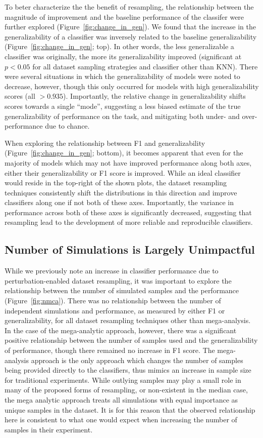 \documentclass[10pt]{SelfArx} %
\begin{document}
To beter characterize the the benefit of resampling, the relationship between the magnitude of improvement and the
baseline performance of the classifer were further explored (Figure~\ref{fig:change_in_gen}). We found that the
increase in the generalizability of a classifier was inversely related to the baseline generalizability
(Figure~\ref{fig:change_in_gen}; top). In other words, the less generalizable a classifier was originally, the more its
generalizability improved (significant at $p < 0.05$ for all dataset sampling strategies and classifier other than
KNN). There were several situations in which the generalizability of models were noted to decrease, however, though
this only occurred for models with high generalizability scores (all $>0.935$). Importantly, the relative change in
generalizability shifts scores towards a single ``mode'', suggesting a less biased estimate of the true
generalizability of performance on the task, and mitigating both under- and over-performance due to chance.

When exploring the relationship between F1 and generalizability (Figure~\ref{fig:change_in_gen}; bottom), it becomes
apparent that even for the majority of models which may not have improved performance along both axes, either their
generalizability or F1 score is improved. While an ideal classifier would reside in the top-right of the shown plots,
the dataset resampling techniques consistently shift the distributions in this direction and improve classifiers along
one if not both of these axes. Importantly, the variance in performance across both of these axes is significantly
decreased, suggesting that resampling lead to the development of more reliable and reproducible classifiers.

\subsection*{Number of Simulations is Largely Unimpactful}

While we previously note an increase in classifier performance due to perturbation-enabled dataset resampling, it was
important to explore the relationship between the number of simulated samples and the performance
(Figure~\ref{fig:nmca}). There was no relationship between the number of independent simulations and performance, as
measured by either F1 or generalizability, for all dataset resampling techniques other than mega-analysis. In the case
of the mega-analytic approach, however, there was a significant positive relationship between the number of samples
used and the generalizability of performance, though there remained no increase in F1 score. The mega-analysis approach
is the only approach which changes the number of samples being provided directly to the classifiers, thus mimics an
increase in sample size for traditional experiments. While outlying samples may play a small role in many of the
proposed forms of resampling, or non-existent in the median case, the mega analytic approach treats all simulations
with equal importance as unique samples in the dataset. It is for this reason that the observed relationship here
is consistent to what one would expect when increasing the number of samples in their experiment.
\end{document}
